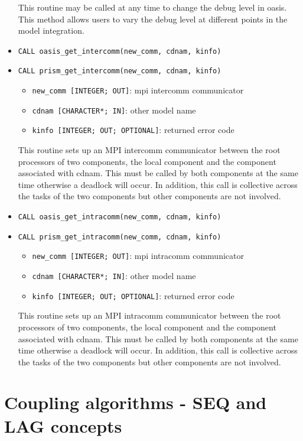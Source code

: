 \begin{itemize}
This routine may be called at any time to change the debug level in oasis.
This method allows users to vary the debug level at different points
in the model integration.

\vspace{0.2cm} 
\item {\tt CALL oasis\_get\_intercomm(new\_comm, cdnam, kinfo)}
\item {\tt CALL prism\_get\_intercomm(new\_comm, cdnam, kinfo)}
\begin{itemize}
\item {\tt new\_comm [INTEGER; OUT]}: mpi intercomm communicator
\item {\tt cdnam [CHARACTER*; IN]}: other model name 
\item {\tt kinfo [INTEGER; OUT; OPTIONAL]}: returned error code
\end{itemize}

This routine sets up an MPI intercomm communicator between the root
processors of two components, the local component and the component
associated with cdnam.  This must be called by both components at
the same time otherwise a deadlock will occur.  In addition, this call
is collective across the tasks of the two components but other
components are not involved.

\vspace{0.2cm} 
\item {\tt CALL oasis\_get\_intracomm(new\_comm, cdnam, kinfo)}
\item {\tt CALL prism\_get\_intracomm(new\_comm, cdnam, kinfo)}
\begin{itemize}
\item {\tt new\_comm [INTEGER; OUT]}: mpi intracomm communicator
\item {\tt cdnam [CHARACTER*; IN]}: other model name 
\item {\tt kinfo [INTEGER; OUT; OPTIONAL]}: returned error code
\end{itemize}

This routine sets up an MPI intracomm communicator between the root
processors of two components, the local component and the component
associated with cdnam.  This must be called by both components at
the same time otherwise a deadlock will occur.  In addition, this call
is collective across the tasks of the two components but other
components are not involved.
\end{itemize}

\section{Coupling algorithms - SEQ and LAG concepts}
\label{subsubsec_Algoritms}

